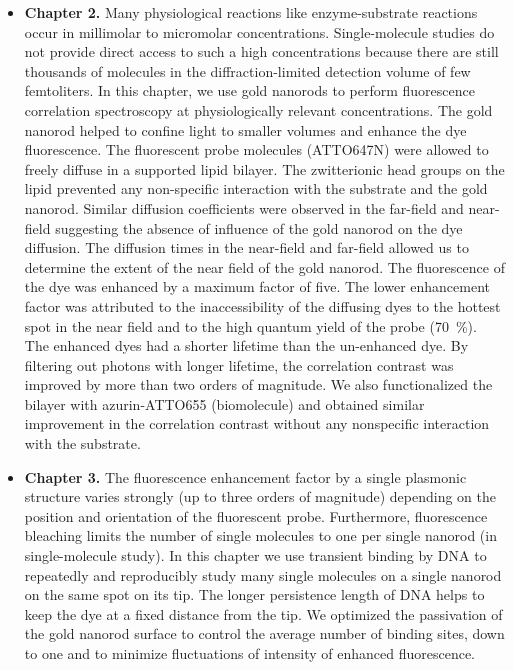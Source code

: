 \begin{itemize}
	\item \textbf{Chapter 2.} Many physiological reactions like enzyme-substrate reactions occur in millimolar to micromolar concentrations. Single-molecule studies do not provide direct access to such a high concentrations because there are still thousands of molecules in the diffraction-limited detection volume of few femtoliters. In this chapter, we use gold nanorods to perform fluorescence correlation spectroscopy at physiologically relevant concentrations. The gold nanorod helped to confine light to smaller volumes and enhance the dye fluorescence. The fluorescent probe molecules (ATTO647N) were allowed to freely diffuse in a supported lipid bilayer. The zwitterionic head groups on the lipid prevented any non-specific interaction with the substrate and the gold nanorod. Similar diffusion coefficients were observed in the far-field and near-field suggesting the absence of influence of the gold nanorod on the dye diffusion. The diffusion times in the near-field and far-field allowed us to determine the extent of the near field of the gold nanorod. The fluorescence of the dye was enhanced by a maximum factor of five. The lower enhancement factor was attributed to the inaccessibility of the diffusing dyes to the hottest spot in the near field and to the high quantum yield of the probe (\SI{70}{\percent}).
	The enhanced dyes had a shorter lifetime than the un-enhanced dye. By filtering out photons with longer lifetime, the correlation contrast was improved by more than two orders of magnitude. We also functionalized the bilayer with azurin-ATTO655 (biomolecule) and obtained similar improvement in the correlation contrast without any nonspecific interaction with the substrate.

	
	\item \textbf{Chapter 3.} The fluorescence enhancement factor by a single plasmonic structure varies strongly  (up to three orders of magnitude) depending on the position and orientation of the fluorescent probe. Furthermore, fluorescence bleaching limits the number of single molecules to one per single nanorod (in single-molecule study). In this chapter we use transient binding by DNA to repeatedly and reproducibly study many single molecules on a single nanorod on the same spot on its tip. The longer persistence length of DNA helps to keep the dye at a fixed distance from the tip. We optimized the passivation of the gold nanorod surface to control the average number of binding sites, down to one and to minimize fluctuations of intensity of enhanced fluorescence.


\end{itemize}
